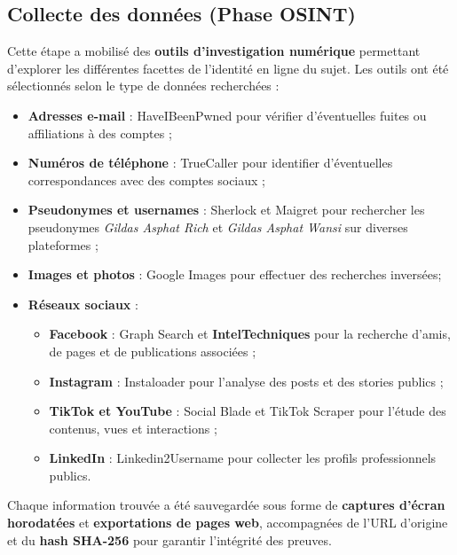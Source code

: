 \documentclass[memoire, 12pt]{report}
\begin{document}
\subsection{Collecte des données (Phase OSINT)}
Cette étape a mobilisé des \textbf{outils d’investigation numérique} permettant d’explorer les différentes facettes de l’identité en ligne du sujet.  
Les outils ont été sélectionnés selon le type de données recherchées :  
\begin{itemize}
    \item \textbf{Adresses e-mail} : HaveIBeenPwned pour vérifier d’éventuelles fuites ou affiliations à des comptes ;
    \item \textbf{Numéros de téléphone} : TrueCaller pour identifier d’éventuelles correspondances avec des comptes sociaux ;
    \item \textbf{Pseudonymes et usernames} : Sherlock et Maigret pour rechercher les pseudonymes \textit{Gildas Asphat Rich} et \textit{Gildas Asphat Wansi} sur diverses plateformes ;
    \item \textbf{Images et photos} : Google Images pour effectuer des recherches inversées;
    \item \textbf{Réseaux sociaux} :
    \begin{itemize}
        \item \textbf{Facebook} : Graph Search et \textbf{IntelTechniques} pour la recherche d’amis, de pages et de publications associées ;
        \item \textbf{Instagram} : Instaloader pour l’analyse des posts et des stories publics ;
        \item \textbf{TikTok et YouTube} : Social Blade et TikTok Scraper pour l’étude des contenus, vues et interactions ;
        \item \textbf{LinkedIn} : Linkedin2Username pour collecter les profils professionnels publics.
    \end{itemize}
\end{itemize}

Chaque information trouvée a été sauvegardée sous forme de \textbf{captures d’écran horodatées} et \textbf{exportations de pages web}, accompagnées de l’URL d’origine et du \textbf{hash SHA-256} pour garantir l’intégrité des preuves.
\end{document}

